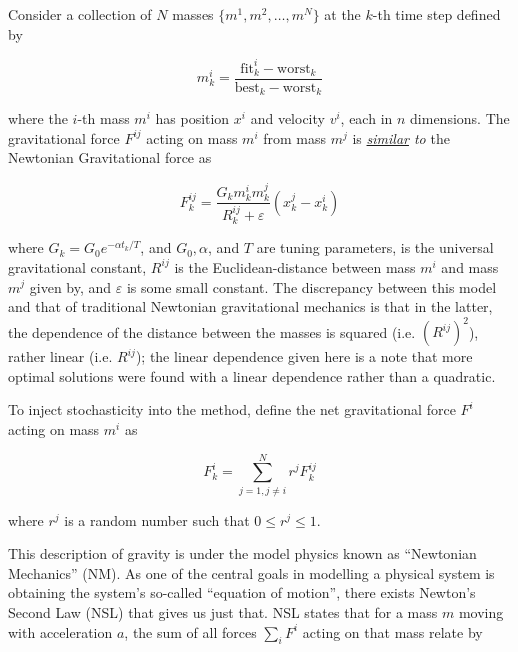 \documentclass{article}
\begin{document}
            Consider a collection of $N$ masses $\{m^1, m^2, \ldots, m^N\}$ at the $k$-th time step defined by 
            
            \begin{equation}
                m_k^i = \frac{\mathrm{fit}_k^i - \mathrm{worst}_k}{\mathrm{best}_k- \mathrm{worst}_k}
            \end{equation}
            
            where the $i$-th mass $m^i$ has position $x^i$ and velocity $v^i$, each in $n$ dimensions.  The gravitational force $F^{ij}$ acting on mass $m^i$ from mass $m^j$ is \emph{\underline{similar} to} the Newtonian Gravitational force as 

            \begin{equation}
                F_k^{ij} = \frac{G_k m_k^i m_k^j}{R_k^{ij} + \varepsilon} \left(x_k^j - x_k^i \right)
            \end{equation}

            where $G_k = G_0 e^{-\alpha t_k /T}$, and $G_0, \alpha$, and $T$ are tuning parameters, is the universal gravitational constant, $R^{ij}$ is the Euclidean-distance between mass $m^i$ and mass $m^j$ given by, and $\varepsilon$ is some small constant.  The discrepancy between this model and that of traditional Newtonian gravitational mechanics is that in the latter, the dependence of the distance between the masses is squared (i.e. $\left(R^{ij}\right)^2$), rather linear (i.e. $R^{ij}$); the linear dependence given here is a note that more optimal solutions were found\cite{GSA} with a linear dependence rather than a quadratic.

            To inject stochasticity into the method, define the net gravitational force $F^i$ acting on mass $m^i$ as 

            \begin{equation}\label{eq:gravity}
                F_k^i = \sum_{j = 1, j \neq i}^{N} r^j F_k^{ij}
            \end{equation}

            where $r^j$ is a random number such that $0 \leq r^j \leq 1$.

            This description of gravity is under the model physics known as ``Newtonian Mechanics'' (NM).  As one of the central goals in modelling a physical system is obtaining the system's so-called ``equation of motion'', there exists Newton's Second Law (NSL) that gives us just that.  NSL states that for a mass $m$ moving with acceleration $a$, the sum of all forces $\sum_i F^i$ acting on that mass relate by
\end{document}
